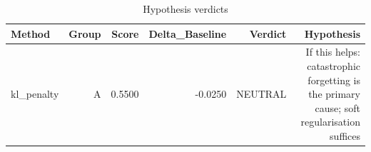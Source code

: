 \begin{table}[htbp]
\centering
\caption{Hypothesis verdicts}
\label{tab:hyp-verdicts}
\begin{tabular}{lrrrrr}
\toprule
\textbf{Method} & \textbf{Group} & \textbf{Score} & \textbf{Delta\_Baseline} & \textbf{Verdict} & \textbf{Hypothesis} \\
\midrule
kl\_penalty & A & 0.5500 & -0.0250 & NEUTRAL & If this helps: catastrophic forgetting is the primary cause; soft regularisation suffices \\
\bottomrule
\end{tabular}
\end{table}